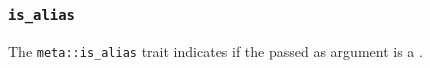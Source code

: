 
\subsubsection{\texttt{is\_alias}}

The \texttt{meta::is\_alias}
trait indicates if the  passed as argument is a .


